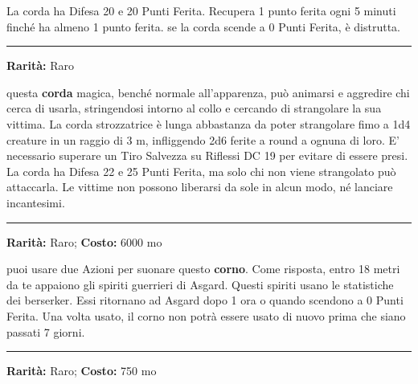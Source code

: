 \begin{multicols}{2}
La corda ha Difesa 20 e 20 Punti Ferita. Recupera 1 punto ferita ogni 5 minuti finché ha almeno 1 punto ferita. se la corda scende a 0 Punti Ferita, è distrutta.

\smallskip\noindent\rule{\linewidth}{2pt}  \hypertarget{CordaStrozzatrice}{}\smallskip{}\noindent\label{CordaStrozzatrice}

\textbf{Rarità:} Raro

questa \textbf{corda} magica, benché normale all'apparenza, può animarsi e aggredire chi cerca di usarla, stringendosi intorno al collo e cercando di strangolare la sua vittima. La corda strozzatrice è lunga abbastanza da poter strangolare fimo a 1d4 creature in un raggio di 3 m, infliggendo 2d6 ferite a round a ognuna di loro. E' necessario superare un Tiro Salvezza su Riflessi DC 19 per evitare di essere presi. La corda ha Difesa 22 e 25 Punti Ferita, ma solo chi non viene strangolato può attaccarla. Le vittime non possono liberarsi da sole in alcun modo, né lanciare incantesimi.

\smallskip\noindent\rule{\linewidth}{2pt}  \hypertarget{CornodelValhalla}{}\smallskip{}\noindent\label{CornodelValhalla}

\textbf{Rarità:} Raro; \textbf{Costo:} 6000 mo

puoi usare due Azioni per suonare questo \textbf{corno}. Come risposta, entro 18 metri da te appaiono gli spiriti guerrieri di Asgard. Questi spiriti usano le statistiche dei berserker. Essi ritornano ad Asgard dopo 1 ora o quando scendono a 0 Punti Ferita. Una volta usato, il corno non potrà essere usato di nuovo prima che siano passati 7 giorni.



\smallskip\noindent\rule{\linewidth}{2pt}  \hypertarget{CornodiDistruzione}{}\smallskip{}\noindent\label{CornodiDistruzione}

\textbf{Rarità:} Raro; \textbf{Costo:} 750 mo


\end{multicols}
